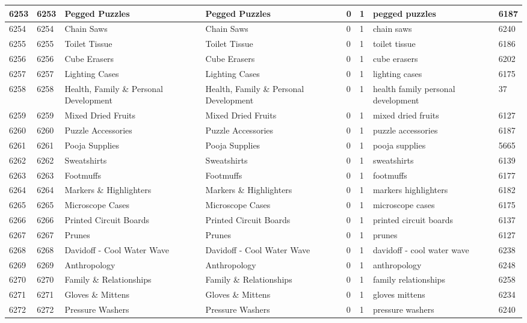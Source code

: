 \begin{longtable}{|l|l|l|l|l|l|l|l|}
6253 & 6253 & Pegged Puzzles & Pegged Puzzles & 0 & 1 & pegged puzzles & 6187 \\ \hline 
6254 & 6254 & Chain Saws & Chain Saws & 0 & 1 & chain saws & 6240 \\ \hline 
6255 & 6255 & Toilet Tissue & Toilet Tissue & 0 & 1 & toilet tissue & 6186 \\ \hline 
6256 & 6256 & Cube Erasers & Cube Erasers & 0 & 1 & cube erasers & 6202 \\ \hline 
6257 & 6257 & Lighting Cases & Lighting Cases & 0 & 1 & lighting cases & 6175 \\ \hline 
6258 & 6258 & Health, Family \& Personal Development & Health, Family \& Personal Development & 0 & 1 & health family personal development & 37 \\ \hline 
6259 & 6259 & Mixed Dried Fruits & Mixed Dried Fruits & 0 & 1 & mixed dried fruits & 6127 \\ \hline 
6260 & 6260 & Puzzle Accessories & Puzzle Accessories & 0 & 1 & puzzle accessories & 6187 \\ \hline 
6261 & 6261 & Pooja Supplies & Pooja Supplies & 0 & 1 & pooja supplies & 5665 \\ \hline 
6262 & 6262 & Sweatshirts & Sweatshirts & 0 & 1 & sweatshirts & 6139 \\ \hline 
6263 & 6263 & Footmuffs & Footmuffs & 0 & 1 & footmuffs & 6177 \\ \hline 
6264 & 6264 & Markers \& Highlighters & Markers \& Highlighters & 0 & 1 & markers highlighters & 6182 \\ \hline 
6265 & 6265 & Microscope Cases & Microscope Cases & 0 & 1 & microscope cases & 6175 \\ \hline 
6266 & 6266 & Printed Circuit Boards & Printed Circuit Boards & 0 & 1 & printed circuit boards & 6137 \\ \hline 
6267 & 6267 & Prunes & Prunes & 0 & 1 & prunes & 6127 \\ \hline 
6268 & 6268 & Davidoff - Cool Water Wave & Davidoff - Cool Water Wave & 0 & 1 & davidoff - cool water wave & 6238 \\ \hline 
6269 & 6269 & Anthropology & Anthropology & 0 & 1 & anthropology & 6248 \\ \hline 
6270 & 6270 & Family \& Relationships & Family \& Relationships & 0 & 1 & family relationships & 6258 \\ \hline 
6271 & 6271 & Gloves \& Mittens & Gloves \& Mittens & 0 & 1 & gloves mittens & 6234 \\ \hline 
6272 & 6272 & Pressure Washers & Pressure Washers & 0 & 1 & pressure washers & 6240 \\ \hline 

\end{longtable}
